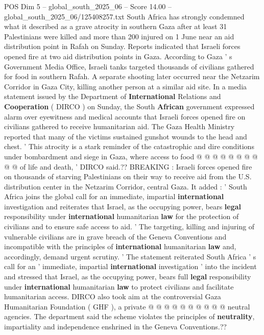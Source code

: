 \begin{textsample}{POS Dim 5 – global\_south\_2025\_06 – Score 14.00 – global\_south\_2025\_06/125408257.txt}  \label{ex:f5_pos_050}
South Africa has strongly condemned what it described as a grave atrocity in southern Gaza after at least 31 Palestinians were killed and more than 200 injured on 1 June near an aid distribution point in Rafah on Sunday.
Reports indicated that Israeli forces opened fire at two aid distribution points in Gaza.
According to Gaza ' s Government Media Office, Israeli tanks targeted thousands of civilians gathered for food in southern Rafah.
A separate shooting later occurred near the Netzarim Corridor in Gaza City, killing another person at a similar aid site.
In a media statement issued by the Department of \textbf{International} Relations and \textbf{Cooperation} ( DIRCO ) on Sunday, the South \textbf{African} government expressed alarm over eyewitness and medical accounts that Israeli forces opened fire on civilians gathered to receive humanitarian aid.
The Gaza Health Ministry reported that many of the victims sustained gunshot wounds to the head and chest. ' This atrocity is a stark reminder of the catastrophic and dire conditions under bombardment and siege in Gaza, where access to food @ @ @ @ @ @ @ @ @ @ of life and death, ' DIRCO said.??
BREAKING : Israeli forces opened fire on thousands of starving Palestinians on their way to receive aid from the U.S. distribution center in the Netzarim Corridor, central Gaza.
It added : ' South Africa joins the global call for an immediate, impartial \textbf{international} investigation and reiterates that Israel, as the occupying power, bears \textbf{legal} responsibility under \textbf{international} humanitarian \textbf{law} for the protection of civilians and to ensure safe access to aid. ' The targeting, killing and injuring of vulnerable civilians are in grave breach of the Geneva Conventions and incompatible with the principles of \textbf{international} humanitarian \textbf{law} and, accordingly, demand urgent scrutiny. ' The statement reiterated South Africa ' s call for an ' immediate, impartial \textbf{international} investigation ' into the incident and stressed that Israel, as the occupying power, bears full \textbf{legal} responsibility under \textbf{international} humanitarian \textbf{law} to protect civilians and facilitate humanitarian access.
DIRCO also took aim at the controversial Gaza Humanitarian Foundation ( GHF ), a private @ @ @ @ @ @ @ @ @ @ neutral agencies.
The department said the scheme violates the principles of \textbf{neutrality}, impartiality and independence enshrined in the Geneva Conventions.??

\end{textsample}
